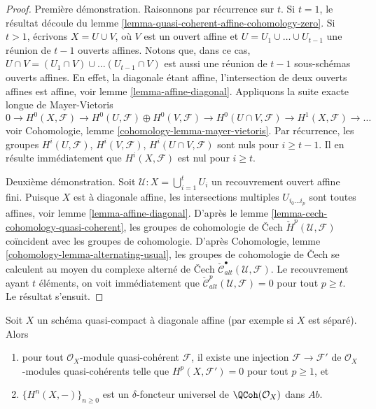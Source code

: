 \begin{proof}
Première démonstration.
Raisonnons par récurrence sur $t$.
Si $t = 1$, le résultat découle du
lemme \ref{lemma-quasi-coherent-affine-cohomology-zero}.
Si $t > 1$, écrivons $X = U \cup V$, où $V$ est un ouvert affine et
$U = U_1 \cup \ldots \cup U_{t - 1}$ une réunion de $t - 1$ ouverts affines.
Notons que, dans ce cas,
$U \cap V =  (U_1 \cap V) \cup \ldots (U_{t - 1} \cap V)$
est aussi une réunion de $t - 1$ sous-schémas ouverts affines.
En effet, la diagonale étant affine, l'intersection de deux
ouverts affines est affine, voir lemme \ref{lemma-affine-diagonal}.
Appliquons la suite exacte longue de Mayer-Vietoris
$$
0 \to
H^0(X, \mathcal{F}) \to
H^0(U, \mathcal{F}) \oplus H^0(V, \mathcal{F}) \to
H^0(U \cap V, \mathcal{F}) \to
H^1(X, \mathcal{F}) \to \ldots
$$
voir Cohomologie, lemme \ref{cohomology-lemma-mayer-vietoris}.
Par récurrence, les groupes $H^i(U, \mathcal{F})$,
$H^i(V, \mathcal{F})$, $H^i(U \cap V, \mathcal{F})$ sont nuls pour
$i \geq t - 1$. Il en résulte immédiatement que $H^i(X, \mathcal{F})$
est nul pour $i \geq t$.

\medskip\noindent
Deuxième démonstration.
Soit $\mathcal{U} : X = \bigcup_{i = 1}^t U_i$ un recouvrement ouvert affine
fini. Puisque $X$ est à diagonale affine, les intersections multiples
$U_{i_0 \ldots i_p}$ sont toutes affines, voir
lemme \ref{lemma-affine-diagonal}.
D'après le lemme \ref{lemma-cech-cohomology-quasi-coherent}, les groupes de cohomologie de {\v C}ech
$\check{H}^p(\mathcal{U}, \mathcal{F})$
coïncident avec les groupes de cohomologie. D'après
Cohomologie, lemme \ref{cohomology-lemma-alternating-usual},
les groupes de cohomologie de {\v C}ech se calculent au moyen du complexe alterné de
{\v C}ech $\check{\mathcal{C}}_{alt}^\bullet(\mathcal{U}, \mathcal{F})$.
Le recouvrement ayant $t$ éléments, on voit immédiatement
que $\check{\mathcal{C}}_{alt}^p(\mathcal{U}, \mathcal{F}) = 0$
pour tout $p \geq t$. Le résultat s'ensuit.
\end{proof}

\begin{lemma}
\label{lemma-affine-diagonal-universal-delta-functor}
Soit $X$ un schéma quasi-compact à diagonale affine
(par exemple si $X$ est séparé). Alors
\begin{enumerate}
\item pour tout $\mathcal{O}_X$-module quasi-cohérent $\mathcal{F}$,
il existe une injection $\mathcal{F} \to \mathcal{F}'$
de $\mathcal{O}_X$-modules
quasi-cohérents telle que $H^p(X, \mathcal{F}') = 0$ pour tout $p \geq 1$, et
\item $\{H^n(X, -)\}_{n \geq 0}$
est un $\delta$-foncteur universel de $\QCoh(\mathcal{O}_X)$ dans
$\textit{Ab}$.
\end{enumerate}
\end{lemma}

